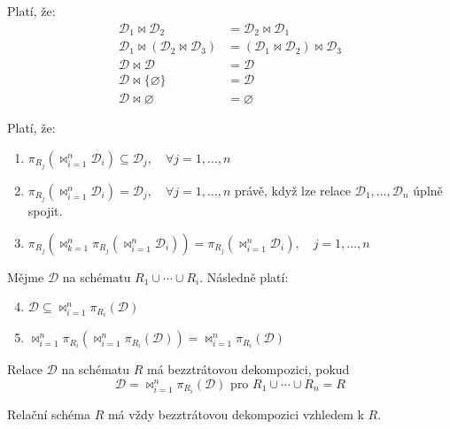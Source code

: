 \begin{upquote}
Platí, že:
\begin{align}
\tag{Komutativita}\mathcal{D}_{1} \Join \mathcal{D}_{2} &= \mathcal{D}_{2} \Join \mathcal{D}_{1} \\
\tag{Asociativita}\mathcal{D}_{1} \Join (\mathcal{D}_{2} \Join \mathcal{D}_{3}) &= (\mathcal{D}_{1} \Join \mathcal{D}_{2}) \Join \mathcal{D}_{3} \\
\tag{Idempotence}\mathcal{D} \Join \mathcal{D} &= \mathcal{D} \\
\tag{Neutralita vůči množině obs. $\varnothing$}\mathcal{D} \Join \lbrace \varnothing \rbrace &= \mathcal{D} \\
\tag{Neutralita vůči prázdné množině}\mathcal{D} \Join \varnothing &= \varnothing
\end{align}
\end{upquote}
\begin{upquote}
Platí, že:
\begin{enumerate}
\item $\pi_{R_{j}} (\Join_{i = 1}^{n} \mathcal{D}_{i}) \subseteq \mathcal{D}_{j}, \quad \forall j = 1, \ldots, n$
\item $\pi_{R_{j}} (\Join_{i = 1}^{n} \mathcal{D}_{i}) = \mathcal{D}_{j}, \quad \forall j = 1, \ldots, n$ právě, když lze relace $\mathcal{D}_{1}, \ldots, \mathcal{D}_{n}$ úplně spojit.
\item $\pi_{R_{j}} (\Join_{k = 1}^{n} \pi_{R_{j}} (\Join_{i = 1}^{n} \mathcal{D}_{i})) = \pi_{R_{j}} (\Join_{i = 1}^{n} \mathcal{D}_{i}), \quad j = 1, \ldots, n$
\end{enumerate}
Mějme $\mathcal{D}$ na schématu $R_{1} \cup \cdots \cup R_{i}$. Následně platí:
\begin{enumerate}
\setcounter{enumi}{3}
\item $\mathcal{D} \subseteq \Join_{i = 1}^{n} \pi_{R_{i}} (\mathcal{D})$
\item $\Join_{i = 1}^{n} \pi_{R_{i}} (\Join_{i = 1}^{n} \pi_{R_{i}} (\mathcal{D})) = \Join_{i = 1}^{n} \pi_{R_{i}} (\mathcal{D}) $
\end{enumerate}
\end{upquote}
\begin{uptheorem}
Relace $\mathcal{D}$ na schématu $R$ má bezztrátovou dekompozici, pokud
$$
\mathcal{D} = \Join_{i = 1}^{n} \pi_{R_{i}} (\mathcal{D}) \text{ pro } R_{1} \cup \cdots \cup R_{n} = R
$$
\end{uptheorem}
\begin{upnote}
Relační schéma $R$ má vždy bezztrátovou dekompozici vzhledem k $R$.
\end{upnote}

